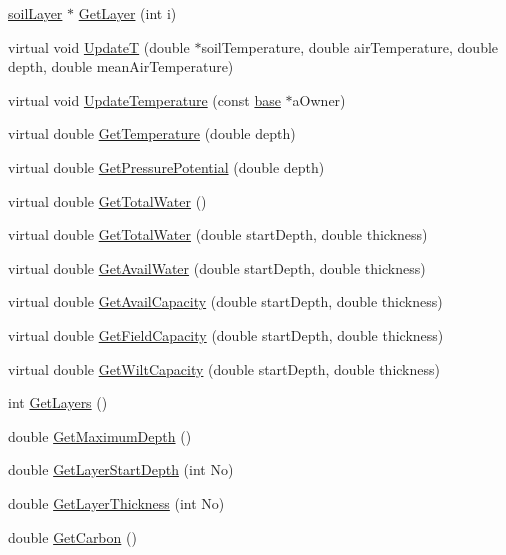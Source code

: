\begin{DoxyCompactItemize}
\hyperlink{classsoil_layer}{soilLayer} $\ast$ \hyperlink{classsoil_profile_aa91d669a4d9cc0755e7a277ae09dd7cd}{GetLayer} (int i)
\item 
virtual void \hyperlink{classsoil_profile_a746e2b78952a19280ace39d3518dc109}{UpdateT} (double $\ast$soilTemperature, double airTemperature, double depth, double meanAirTemperature)
\item 
virtual void \hyperlink{classsoil_profile_ab754bbc57f8cc220f59f9695d6de51e7}{UpdateTemperature} (const \hyperlink{classbase}{base} $\ast$aOwner)
\item 
virtual double \hyperlink{classsoil_profile_a0ce7a0cacb136fae92fac737f23fe46f}{GetTemperature} (double depth)
\item 
virtual double \hyperlink{classsoil_profile_a2991385a93a7624c9aaa7bb395464943}{GetPressurePotential} (double depth)
\item 
virtual double \hyperlink{classsoil_profile_a25cf83f98b4a58017331dbf78ee31824}{GetTotalWater} ()
\item 
virtual double \hyperlink{classsoil_profile_a3a8791cd9244ae7c70246be2e5a27b02}{GetTotalWater} (double startDepth, double thickness)
\item 
virtual double \hyperlink{classsoil_profile_a51f57a7397df5853e8899f34ada2d374}{GetAvailWater} (double startDepth, double thickness)
\item 
virtual double \hyperlink{classsoil_profile_adc7003b312a9bcc2fffdd45acfc65f28}{GetAvailCapacity} (double startDepth, double thickness)
\item 
virtual double \hyperlink{classsoil_profile_a6c154b0cb0b3ab611efde6f50d53cbc7}{GetFieldCapacity} (double startDepth, double thickness)
\item 
virtual double \hyperlink{classsoil_profile_a1ff69f03ceffe60204f25f0fd73b2e07}{GetWiltCapacity} (double startDepth, double thickness)
\item 
int \hyperlink{classsoil_profile_acd5861b315e18288325accc522e42918}{GetLayers} ()
\item 
double \hyperlink{classsoil_profile_aa28fc2eb898f40cec10a9e57906b36de}{GetMaximumDepth} ()
\item 
double \hyperlink{classsoil_profile_a44e267969da21ed965b66e06fe40a618}{GetLayerStartDepth} (int No)
\item 
double \hyperlink{classsoil_profile_a062bc6b13eb0debe7a8a8c1e31c53b4e}{GetLayerThickness} (int No)
\item 
double \hyperlink{classsoil_profile_afb39b89d67044da69b0258915c5eed1e}{GetCarbon} ()

\end{DoxyCompactItemize}
